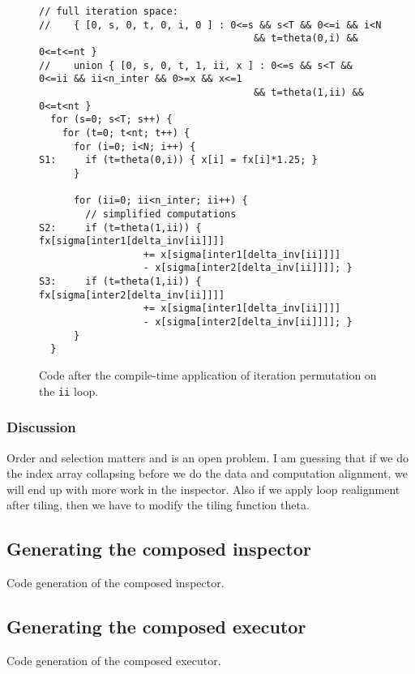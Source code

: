 \documentclass{article}
\begin{document}
\begin{figure}
\begin{verbatim}
// full iteration space:
//    { [0, s, 0, t, 0, i, 0 ] : 0<=s && s<T && 0<=i && i<N 
                                     && t=theta(0,i) && 0<=t<=nt }
//    union { [0, s, 0, t, 1, ii, x ] : 0<=s && s<T && 0<=ii && ii<n_inter && 0>=x && x<=1 
                                     && t=theta(1,ii) && 0<=t<nt }
  for (s=0; s<T; s++) {
    for (t=0; t<nt; t++) {
      for (i=0; i<N; i++) { 
S1:     if (t=theta(0,i)) { x[i] = fx[i]*1.25; }
      }

      for (ii=0; ii<n_inter; ii++) {
        // simplified computations
S2:     if (t=theta(1,ii)) { fx[sigma[inter1[delta_inv[ii]]]] 
                  += x[sigma[inter1[delta_inv[ii]]]] 
                  - x[sigma[inter2[delta_inv[ii]]]]; }
S3:     if (t=theta(1,ii)) { fx[sigma[inter2[delta_inv[ii]]]] 
                  += x[sigma[inter1[delta_inv[ii]]]] 
                  - x[sigma[inter2[delta_inv[ii]]]]; }
      }
  }\end{verbatim}
\caption{Code after the compile-time application of iteration permutation on the
{\tt ii} loop.}
\label{fig:codeAfterST}
\end{figure}


\subsubsection{Discussion}
Order and selection matters and is an open problem.  I am guessing that if we do the index array collapsing before we do the data and computation alignment, we will end up with more work in the inspector.  Also if we apply loop realignment after tiling, then we have to modify the tiling function theta.

\subsection{Generating the composed inspector}
Code generation of the composed inspector.

\subsection{Generating the composed executor}
Code generation of the composed executor.
\end{document}
